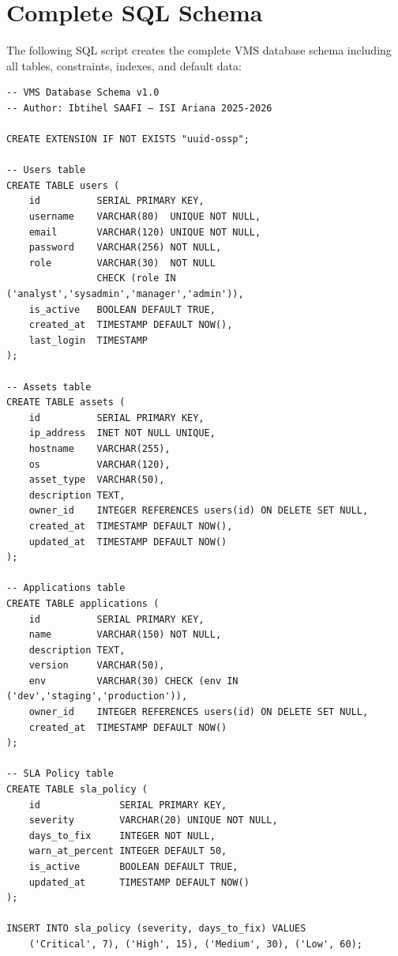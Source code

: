 \chapter{Complete SQL Schema}
\label{app:sql}

The following SQL script creates the complete VMS database schema including all tables, constraints, indexes, and default data:

\begin{lstlisting}[style=sql, caption={Complete VMS Database Schema}, label={lst:fullsql}]
-- VMS Database Schema v1.0
-- Author: Ibtihel SAAFI — ISI Ariana 2025-2026

CREATE EXTENSION IF NOT EXISTS "uuid-ossp";

-- Users table
CREATE TABLE users (
    id          SERIAL PRIMARY KEY,
    username    VARCHAR(80)  UNIQUE NOT NULL,
    email       VARCHAR(120) UNIQUE NOT NULL,
    password    VARCHAR(256) NOT NULL,
    role        VARCHAR(30)  NOT NULL
                CHECK (role IN ('analyst','sysadmin','manager','admin')),
    is_active   BOOLEAN DEFAULT TRUE,
    created_at  TIMESTAMP DEFAULT NOW(),
    last_login  TIMESTAMP
);

-- Assets table
CREATE TABLE assets (
    id          SERIAL PRIMARY KEY,
    ip_address  INET NOT NULL UNIQUE,
    hostname    VARCHAR(255),
    os          VARCHAR(120),
    asset_type  VARCHAR(50),
    description TEXT,
    owner_id    INTEGER REFERENCES users(id) ON DELETE SET NULL,
    created_at  TIMESTAMP DEFAULT NOW(),
    updated_at  TIMESTAMP DEFAULT NOW()
);

-- Applications table
CREATE TABLE applications (
    id          SERIAL PRIMARY KEY,
    name        VARCHAR(150) NOT NULL,
    description TEXT,
    version     VARCHAR(50),
    env         VARCHAR(30) CHECK (env IN ('dev','staging','production')),
    owner_id    INTEGER REFERENCES users(id) ON DELETE SET NULL,
    created_at  TIMESTAMP DEFAULT NOW()
);

-- SLA Policy table
CREATE TABLE sla_policy (
    id              SERIAL PRIMARY KEY,
    severity        VARCHAR(20) UNIQUE NOT NULL,
    days_to_fix     INTEGER NOT NULL,
    warn_at_percent INTEGER DEFAULT 50,
    is_active       BOOLEAN DEFAULT TRUE,
    updated_at      TIMESTAMP DEFAULT NOW()
);

INSERT INTO sla_policy (severity, days_to_fix) VALUES
    ('Critical', 7), ('High', 15), ('Medium', 30), ('Low', 60);


\end{lstlisting}
